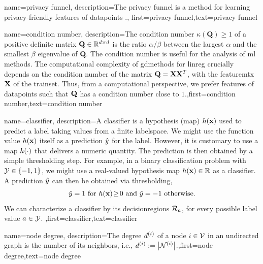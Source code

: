 {name={privacy funnel},
 description={The privacy funnel is a method for learning privacy-friendly \gls{feature}s 
	of \gls{datapoint}s \cite{PrivacyFunnel}.},
 first={privacy funnel},text={privacy funnel} 
}

{
	name={condition number},
	description={The condition number $\kappa(\mathbf{Q}) \geq 1$ of a 
		positive definite 
		matrix $\mathbf{Q} \in \mathbb{R}^{d \times d}$ is the ratio 
		$\alpha /\beta  $ between the 
		largest $\alpha$ and the smallest $\beta$ \gls{eigenvalue} of 
		$\mathbf{Q}$. The condition number is useful for the analysis of \gls{ml} methods. 
		The computational complexity of \gls{gdmethods} for \gls{linreg} crucially depends on the 
		condition number of the matrix $\mathbf{Q} = {\bf X} {\bf X}^{T}$, with the \gls{featuremtx} ${\bf X}$ 
		of the \gls{trainset}. Thus, from a computational perspective, we prefer \gls{feature}s of 
		\gls{datapoint}s such that $\mathbf{Q}$ has a condition number close to $1$.},first={condition number},text={condition number} 
}

{
	name={classifier},
	description={A classifier is a \gls{hypothesis} (map) $h({\bf x})$ 
		used to predict a \gls{label} taking values from a finite \gls{labelspace}. We might use the 
		function value $h({\bf x})$ itself as a \gls{prediction} $\hat{y}$ for 
		the \gls{label}. However, it is customary to use a map $h(\cdot)$ that delivers 
		a numeric quantity. The \gls{prediction} is then obtained by a simple thresholding step. 
		For example, in a binary \gls{classification} problem with \label{labelspace} $\mathcal{Y} \in  \{ -1,1\}$, 
		we might use a real-valued \gls{hypothesis} map $h({\bf x}) \in \mathbb{R}$ 
		as a classifier. A \gls{prediction} $\hat{y}$ can then be obtained via thresholding,  
		 \begin{equation} 
		 	\label{equ_def_threshold_bin_classifier_dict}
		 	\hat{y} =1   \mbox{ for } h({\bf x})\!\geq\!0 \mbox{ and } 	\hat{y} =-1  \mbox{ otherwise.}
	 		\end{equation}
 		We can characterize a classifier by its \gls{decisionregion}s $\mathcal{R}_{a}$, for 
 		every possible \gls{label} value $a \in \mathcal{Y}$. },first={classifier},text={classifier} 
}

{name={node degree},
	description={The degree $d^{(i)}$ of a node $i \in \mathcal{V}$ 
		in an undirected \gls{graph} is the number of its \gls{neighbors}, i.e., $d^{(i)} := \big|\mathcal{N}^{(i)}\big|$.},first={node degree},text={node degree} 
}

